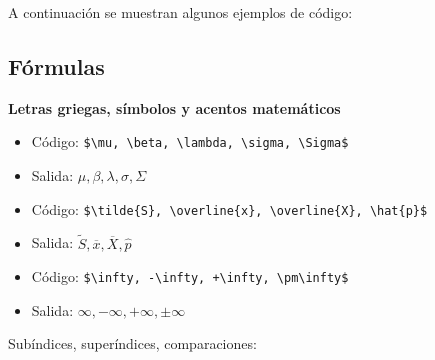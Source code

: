 \documentclass[]{article}
\begin{document}
A continuación se muestran algunos ejemplos de código:

\subsection{Fórmulas}\label{formulas}

\textbf{Letras griegas, símbolos y acentos matemáticos}

\begin{itemize}
\itemsep1pt\parskip0pt
\item
  Código:
  \texttt{\$\textbackslash{}mu, \textbackslash{}beta, \textbackslash{}lambda, \textbackslash{}sigma, \textbackslash{}Sigma\$}
\item
  Salida: $\mu,\beta,\lambda,\sigma,  \Sigma$
\item
  Código:
  \texttt{\$\textbackslash{}tilde\{S\}, \textbackslash{}overline\{x\},  \textbackslash{}overline\{X\}, \textbackslash{}hat\{p\}\$}
\item
  Salida: $\tilde{S}, \overline{x},  \overline{X}, \hat{p}$
\item
  Código:
  \texttt{\$\textbackslash{}infty, -\textbackslash{}infty,  +\textbackslash{}infty, \textbackslash{}pm\textbackslash{}infty\$}
\item
  Salida: $\infty, -\infty,  +\infty, \pm\infty$
\end{itemize}

Subíndices, superíndices, comparaciones:
\end{document}
